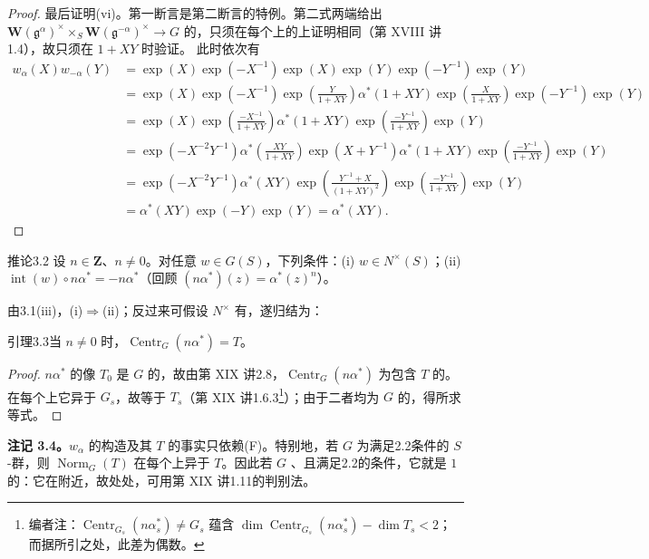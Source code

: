 \begin{proof}
最后证明(vi)。第一断言是第二断言的特例。第二式两端给出 $\mathbf W(\mathfrak g^\alpha)^\times\times_S\mathbf W(\mathfrak g^{-\alpha})^\times\to G$ 的，只须在每个上的上证明相同（第 XVIII 讲1.4），故只须在 $1+XY$ 时验证。
此时依次有
\[\begin{aligned}w_\alpha(X)w_{-\alpha}(Y)&=\exp(X)\exp(-X^{-1})\exp(X)\exp(Y)\exp(-Y^{-1})\exp(Y)\\&=\exp(X)\exp(-X^{-1})\exp\left(\frac Y{1+XY}\right)\alpha^*(1+XY)\exp\left(\frac X{1+XY}\right)\exp(-Y^{-1})\exp(Y)\\&=\exp(X)\exp\left(\frac{-X^{-1}}{1+XY}\right)\alpha^*(1+XY)\exp\left(\frac{-Y^{-1}}{1+XY}\right)\exp(Y)\\&=\exp(-X^{-2}Y^{-1})\alpha^*\left(\frac{XY}{1+XY}\right)\exp(X+Y^{-1})\alpha^*(1+XY)\exp\left(\frac{-Y^{-1}}{1+XY}\right)\exp(Y)\\&=\exp(-X^{-2}Y^{-1})\alpha^*(XY)\exp\left(\frac{Y^{-1}+X}{(1+XY)^2}\right)\exp\left(\frac{-Y^{-1}}{1+XY}\right)\exp(Y)\\&=\alpha^*(XY)\exp(-Y)\exp(Y)=\alpha^*(XY).\end{aligned}\]
\end{proof}
\begin{SGAresult}{推论}{3.2}
设 $n\in\mathbf Z$、$n\ne0$。对任意 $w\in G(S)$，下列条件：(i) $w\in N^\times(S)$；(ii) $\operatorname{int}(w)\circ n\alpha^*=-n\alpha^*$（回顾 $(n\alpha^*)(z)=\alpha^*(z)^n$）。
\end{SGAresult}
由3.1(iii)，(i)$\Rightarrow$(ii)；反过来可假设 $N^\times$ 有，遂归结为：
\begin{SGAresult}{引理}{3.3}当 $n\ne0$ 时，$\operatorname{Centr}_G(n\alpha^*)=T$。\end{SGAresult}
\begin{proof}
$n\alpha^*$ 的像 $T_0$ 是 $G$ 的，故由第 XIX 讲2.8，$\operatorname{Centr}_G(n\alpha^*)$ 为包含 $T$ 的。在每个上它异于 $G_s$，故等于 $T_s$（第 XIX 讲1.6.3\footnote{编者注：$\operatorname{Centr}_{G_s}(n\alpha_s^*)\ne G_s$ 蕴含 $\dim\operatorname{Centr}_{G_s}(n\alpha_s^*)-\dim T_s<2$；而据所引之处，此差为偶数。}）；由于二者均为 $G$ 的，得所求等式。
\end{proof}
\textbf{注记 3.4。}$w_\alpha$ 的构造及其 $T$ 的事实只依赖(F)。特别地，若 $G$ 为满足2.2条件的 $S$-群，则 $\operatorname{Norm}_G(T)$ 在每个上异于 $T$。因此若 $G$ 、且满足2.2的条件，它就是 $1$ 的：它在附近，故处处，可用第 XIX 讲1.11的判别法。

